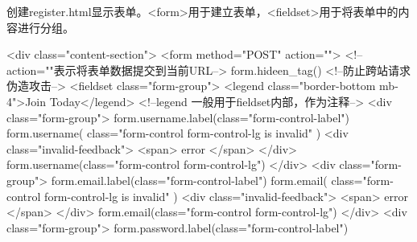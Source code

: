       创建register.html显示表单。<form>用于建立表单，<fieldset>用于将表单中的内容进行分组。
      \begin{codeblock}[language=html, caption={register.html}]
        {%
        {%
            <div class="content-section">
                <form method="POST" action=""> <!--action=""表示将表单数据提交到当前URL-->
                    {{ form.hideen_tag() }} <!--防止跨站请求伪造攻击-->
                    <fieldset class="form-group">
                        <legend class="border-bottom mb-4">Join Today</legend>
                        <!--legend 一般用于fieldset内部，作为注释-->
                        <div class="form-group">
                            {{ form.username.label(class="form-control-label") }}
                            {%
                                {{ 
                                    form.username(
                                        class="form-control form-control-lg is invalid"
                                    ) 
                                }}
                                <div class="invalid-feedback">
                                    {%
                                        <span>{{ error }}</span>
                                    {%
                                </div>
                            {%
                                {{ form.username(class="form-control form-control-lg") }}
                            {%
                        </div>
                        <div class="form-group">
                            {{ form.email.label(class="form-control-label") }}
                            {%
                                {{ 
                                    form.email(
                                        class="form-control form-control-lg is invalid"
                                    ) 
                                }}
                                <div class="invalid-feedback">
                                    {%
                                        <span>{{ error }}</span>
                                    {%
                                </div>
                            {%
                                {{ form.email(class="form-control form-control-lg") }}
                            {%
                        </div>
                        <div class="form-group">
                            {{ form.password.label(class="form-control-label") }}
}}}}}}}}}}}}
\end{codeblock}
